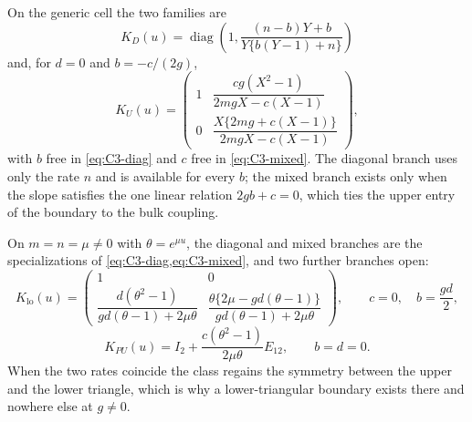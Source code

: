 \documentclass[11pt,reqno]{amsart}
\theoremstyle{plain}
\theoremstyle{definition}
\theoremstyle{remark}
\numberwithin{equation}{section}
\providecommand{\diag}{\operatorname{diag}}
\newcommand{\Id}{I_2}
\begin{document}
On the generic cell the two families are
\begin{equation}
K_D(u)=\diag\left(1,
\frac{(n-b)Y+b}{Y\{b(Y-1)+n\}}\right)            \label{eq:C3-diag}
\end{equation}
and, for $d=0$ and $b=-c/(2g)$,
\begin{equation}
K_U(u)=\begin{pmatrix}
1&\dfrac{cg(X^2-1)}{2mgX-c(X-1)}\\[2mm]
0&\dfrac{X\{2mg+c(X-1)\}}{2mgX-c(X-1)}
\end{pmatrix},                                      \label{eq:C3-mixed}
\end{equation}
with $b$ free in \cref{eq:C3-diag} and $c$ free in \cref{eq:C3-mixed}. The
diagonal branch uses only the rate $n$ and is available for every $b$; the mixed
branch exists only when the slope satisfies the one linear relation $2gb+c=0$,
which ties the upper entry of the boundary to the bulk coupling.

On $m=n=\mu\ne0$ with $\theta=e^{\mu u}$, the diagonal and mixed branches are the
specializations of \cref{eq:C3-diag,eq:C3-mixed}, and two further branches open:
\begin{equation}
K_{\mathrm{lo}}(u)=\begin{pmatrix}
1&0\\[1mm]
\dfrac{d(\theta^2-1)}{gd(\theta-1)+2\mu\theta}&
\dfrac{\theta\{2\mu-gd(\theta-1)\}}{gd(\theta-1)+2\mu\theta}
\end{pmatrix},\qquad c=0,\quad b=\frac{gd}{2},       \label{eq:C3-lower}
\end{equation}
\begin{equation}
K_{PU}(u)=\Id+\frac{c(\theta^2-1)}{2\mu\theta}E_{12},\qquad b=d=0.
\label{eq:C3-pure-upper}
\end{equation}
When the two rates coincide the class regains the symmetry between the upper and
the lower triangle, which is why a lower-triangular boundary exists there and
nowhere else at $g\ne0$.
\end{document}
